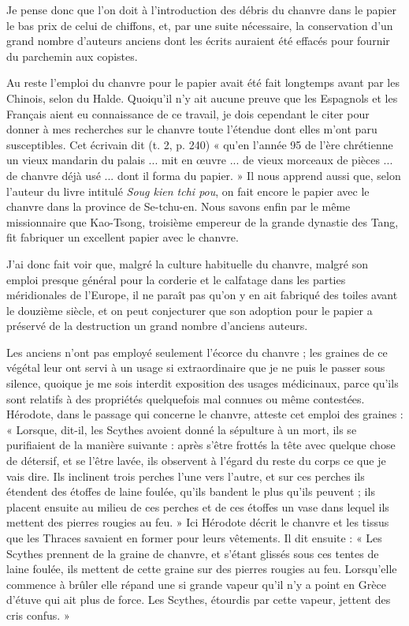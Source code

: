 \documentclass[a4paper, 11pt, oneside, polutonikogreek, french]{article}
\begin{document}
Je pense donc que l'on doit à l'introduction des débris du chanvre dans le papier le bas prix de celui de chiffons, et, par une suite nécessaire, la conservation d'un grand nombre d'auteurs anciens dont les écrits auraient été effacés pour fournir du parchemin aux copistes.

Au reste l'emploi du chanvre pour le papier avait été fait longtemps avant par les Chinois, selon du Halde. Quoiqu'il n'y ait aucune preuve que les Espagnols et les Français aient eu connaissance de ce travail, je dois cependant le citer pour donner à mes recherches sur le chanvre toute l'étendue dont elles m'ont paru susceptibles. Cet écrivain dit (t. 2, p. 240) « qu'en l'année 95 de l'ère chrétienne un vieux mandarin du palais ... mit en œuvre ... de vieux morceaux de pièces ... de chanvre déjà usé ... dont il forma du papier. » Il nous apprend aussi que, selon l'auteur du livre intitulé \emph{Soug kien tchi pou}, on fait encore le papier avec le chanvre dans la province de Se-tchu-en. Nous savons enfin par le même missionnaire que Kao-Tsong, troisième empereur de la grande dynastie des Tang, fit fabriquer un excellent papier avec le chanvre.

J'ai donc fait voir que, malgré la culture habituelle du chanvre, malgré son emploi presque général pour la corderie et le calfatage dans les parties méridionales de l'Europe, il ne paraît pas qu'on y en ait fabriqué des toiles avant le douzième siècle, et on peut conjecturer que son adoption pour le papier a préservé de la destruction un grand nombre d'anciens auteurs.

Les anciens n'ont pas employé seulement l'écorce du chanvre ; les graines de ce végétal leur ont servi à un usage si extraordinaire que je ne puis le passer sous silence, quoique je me sois interdit exposition des usages médicinaux, parce qu'ils sont relatifs à des propriétés quelquefois mal connues ou même contestées. Hérodote, dans le passage qui concerne le chanvre, atteste cet emploi des graines : « Lorsque, dit-il, les Scythes avoient donné la sépulture à un mort, ils se purifiaient de la manière suivante : après s'être frottés la tête avec quelque chose de détersif, et se l'être lavée, ils observent à l'égard du reste du corps ce que je vais dire. Ils inclinent trois perches l'une vers l'autre, et sur ces perches ils étendent des étoffes de laine foulée, qu'ils bandent le plus qu'ils peuvent ; ils placent ensuite au milieu de ces perches et de ces étoffes un vase dans lequel ils mettent des pierres rougies au feu. » Ici Hérodote décrit le chanvre et les tissus que les Thraces savaient en former pour leurs vêtements. Il dit ensuite : « Les Scythes prennent de la graine de chanvre, et s'étant glissés sous ces tentes de laine foulée, ils mettent de cette graine sur des pierres rougies au feu. Lorsqu'elle commence à brûler elle répand une si grande vapeur qu'il n'y a point en Grèce d'étuve qui ait plus de force. Les Scythes, étourdis par cette vapeur, jettent des cris confus. »
\end{document}
